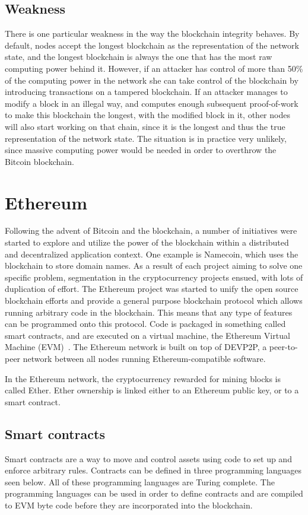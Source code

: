 \subsection{Weakness}
There is one particular weakness in the way the blockchain integrity behaves. By default, nodes accept the longest blockchain as the representation of the network state, and the longest blockchain is always the one that has the most raw computing power behind it. However, if an attacker has control of more than 50\% of the computing power in the network she can take control of the blockchain by introducing transactions on a tampered blockchain. If an attacker manages to modify a block in an illegal way, and computes enough subsequent proof-of-work to make this blockchain the longest, with the modified block in it, other nodes will also start working on that chain, since it is the longest and thus the true representation of the network state. The situation is in practice very unlikely, since massive computing power would be needed in order to overthrow the Bitcoin blockchain.

\section{Ethereum}
Following the advent of Bitcoin and the blockchain, a number of initiatives were started to explore and utilize the power of the blockchain within a distributed and decentralized application context. One example is Namecoin, which uses the blockchain to store domain names. As a result of each project aiming to solve one specific problem, segmentation in the cryptocurrency projects ensued, with lots of duplication of effort. The Ethereum project was started to unify the open source blockchain efforts and provide a general purpose blockchain protocol which allows running arbitrary code in the blockchain. This means that any type of features can be programmed onto this protocol. Code is packaged in something called smart contracts, and are executed on a virtual machine, the Ethereum Virtual Machine (EVM)~\cite{ethereum:white}. The Ethereum network is built on top of DEVP2P, a peer-to-peer network between all nodes running Ethereum-compatible software.

In the Ethereum network, the cryptocurrency rewarded for mining blocks is called Ether. Ether ownership is linked either to an Ethereum public key, or to a smart contract.

\subsection{Smart contracts}
Smart contracts are a way to move and control assets using code to set up and enforce arbitrary rules. Contracts can be defined in three programming languages seen below. All of these programming languages are Turing complete. The programming languages can be used in order to define contracts and are compiled to EVM byte code before they are incorporated into the blockchain.

